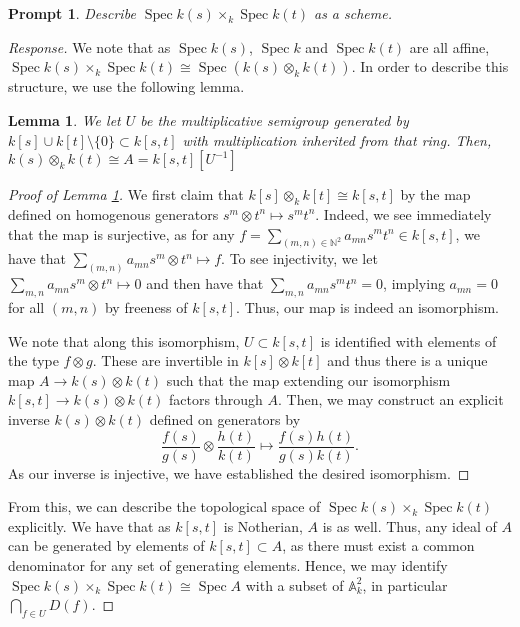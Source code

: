 \documentclass[english,letter,doublesided]{article}
\DeclareMathOperator{\spec}{Spec}
\renewcommand{\AA}{\mathbb{A}}
\newcommand{\NN}{\mathbb{N}}
\newenvironment{subproof}[1][\proofname]{%
	\renewcommand{\qedsymbol}{$\blacksquare$}%
	\begin{proof}[#1]%
	}{%
	\end{proof}%
}
\newcommand{\prob}[1]{\setcounter{section}{#1-1}\section{}}
\newtheorem{lemma}[thm]{Lemma}
\newtheorem*{prompt*}{Prompt}
\theoremstyle{remark}
\theoremstyle{definition}
\begin{document}
%
%
%
%
%
\prob{8}
\begin{prompt*}
	Describe $\spec k(s)\times_k \spec k(t)$ as a scheme.
\end{prompt*}\begin{proof}[Response]
We note that as $\spec k(s)$, $\spec k$ and $\spec k(t)$ are all affine, $\spec k(s)\times_k \spec k(t)\cong \spec (k(s)\otimes_k k(t))$. In order to describe this structure, we use the following lemma.
\begin{lemma} We let $U$ be the multiplicative semigroup generated by $k[s]\cup k[t]\setminus \{0\}\subset k[s,t]$ with multiplication inherited from that ring. Then,
$k(s)\otimes_k k(t)\cong A= k[s,t]\left[U^{-1}\right]$\label{8tens}
\end{lemma}
\begin{subproof}[Proof of Lemma \ref{8tens}]
We first claim that $k[s]\otimes_k k[t]\cong k[s,t]$ by the map defined on homogenous generators  $s^m\otimes t^n\mapsto s^mt^n$. Indeed, we see immediately that the map is surjective, as for any $f=\sum_{(m,n)\in \NN^2}a_{mn}s^mt^n\in k[s,t]$, we have that $\sum_{(m,n)}a_{mn}s^m\otimes t^n\mapsto  f$. To see injectivity, we let $\sum_{m,n}a_{mn}s^m\otimes t^n\mapsto 0$ and then have that $\sum_{m,n} a_{mn}s^mt^n=0$, implying $a_{mn}=0$ for all $(m,n)$ by freeness of $k[s,t]$. Thus, our map is indeed an isomorphism. 

We note that along this isomorphism, $U\subset k[s,t]$ is identified with elements of the type $f\otimes g$. These are invertible in $k[s]\otimes k[t]$ and thus there is a unique map $A\to k(s)\otimes k(t)$ such that the map extending our isomorphism $k[s,t]\to k(s)\otimes k(t)$ factors through $A$. Then, we may construct an explicit inverse $k(s)\otimes k(t)$ defined on generators by $$\frac{f(s)}{g(s)}\otimes \frac{h(t)}{k(t)}\mapsto \frac{f(s)h(t)}{g(s)k(t)}.$$ As our inverse is injective, we have established the desired isomorphism.
\end{subproof}
From this, we can describe the topological space of $\spec k(s)\times_k \spec k(t)$ explicitly. We have that as $k[s,t]$ is Notherian, $A$ is as well. Thus, any ideal of $A$ can be generated by elements of $k[s,t]\subset A$, as there must exist a common denominator for any set of generating elements. Hence, we may identify $\spec k(s)\times_k \spec k(t)\cong\spec A$ with a subset of $\AA_k^2$, in particular $\bigcap_{f\in U}D(f)$.
\end{proof}
\end{document}
